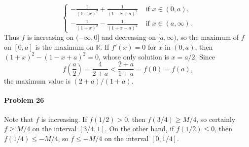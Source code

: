 \documentclass{article}
\begin{document}
\begin{enumerate}[(a)]
\[\begin{cases}
        -\frac{1}{(1 + x)^2} + \frac{1}{(1 - x + a)^2}
        &\text{ if } x \in (0, a), \\
        -\frac{1}{(1 + x)^2} - \frac{1}{(1 + x - a)^2}
        &\text{ if } x \in (a, \infty).
      \end{cases}
    \] Thus $f$ is increasing on $(-\infty, 0]$ and decreasing on $[a,
    \infty)$, so the maximum of $f$ on $[0, a]$ is the maximum on $\mathbb{R}$.
    If $f'(x) = 0$ for $x$ in $(0, a)$, then $(1 + x)^2 - (1 - x + a)^2 = 0$,
    whose only solution is $x = a/2$. Since \[
      f\left( \frac{a}{2} \right)
      = \frac{4}{2 + a}
      < \frac{2 + a}{1 + a}
      = f(0) = f(a),
    \] the maximum value is $(2 + a)/(1 + a)$.
\end{enumerate}

\paragraph{Problem 26} Note that $f$ is increasing. If $f(1/2) > 0$, then
$f(3/4) \geq M/4$, so certainly $f \geq M/4$ on the interval $[3/4, 1]$. On the
other hand, if $f(1/2) \leq 0$, then $f(1/4) \leq -M/4$, so $f \leq -M/4$ on
the interval $[0, 1/4]$.
\end{document}
